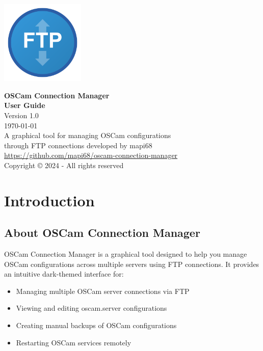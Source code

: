 \documentclass[a4paper,11pt]{report}
\begin{document}

\begin{titlepage}
    \centering
    \vspace*{2cm}
    \includegraphics[width=0.3\textwidth]{icon.png}\par\vspace{1cm}
    {\Huge\bfseries OSCam Connection Manager\\[0.5cm]}
    {\large\bfseries User Guide\\[2cm]}
    {\large Version 1.0\\[1cm]}
    {\large \today\\[2cm]}
    \vfill
    {\large A graphical tool for managing OSCam configurations\\through FTP connections developed by mapi68}\\[0.5cm]
    {\large \url{https://github.com/mapi68/oscam-connection-manager}}\\[1cm]
    {\large Copyright © 2024 - All rights reserved}
\end{titlepage}

\tableofcontents
\newpage

\chapter{Introduction}

\section{About OSCam Connection Manager}
OSCam Connection Manager is a graphical tool designed to help you manage OSCam configurations across multiple servers using FTP connections. It provides an intuitive dark-themed interface for:
\begin{itemize}
    \item Managing multiple OSCam server connections via FTP
    \item Viewing and editing oscam.server configurations
    \item Creating manual backups of OSCam configurations
    \item Restarting OSCam services remotely
\end{itemize}
\end{document}
